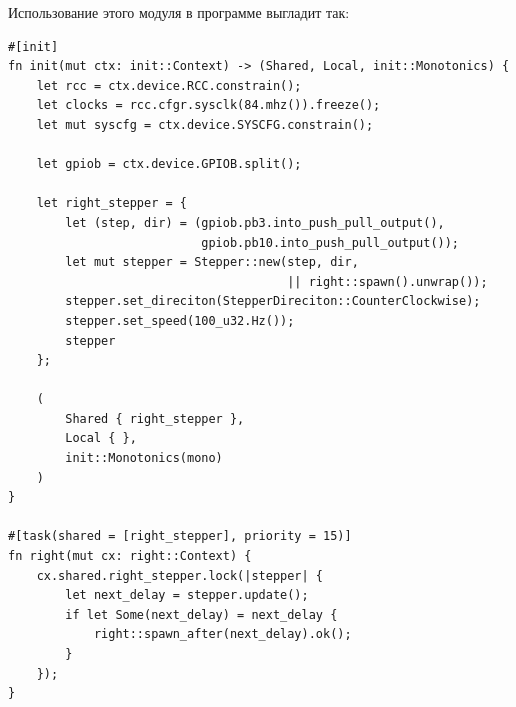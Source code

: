\documentclass[11pt]{article}
\begin{document}
Использование этого модуля в программе выгладит так:
\begin{verbatim}
#[init]
fn init(mut ctx: init::Context) -> (Shared, Local, init::Monotonics) {
    let rcc = ctx.device.RCC.constrain();
    let clocks = rcc.cfgr.sysclk(84.mhz()).freeze();
    let mut syscfg = ctx.device.SYSCFG.constrain();

    let gpiob = ctx.device.GPIOB.split();

    let right_stepper = {
        let (step, dir) = (gpiob.pb3.into_push_pull_output(),
                           gpiob.pb10.into_push_pull_output());
        let mut stepper = Stepper::new(step, dir,
                                       || right::spawn().unwrap());
        stepper.set_direciton(StepperDireciton::CounterClockwise);
        stepper.set_speed(100_u32.Hz());
        stepper
    };

    (
        Shared { right_stepper },
        Local { },
        init::Monotonics(mono)
    )
}

#[task(shared = [right_stepper], priority = 15)]
fn right(mut cx: right::Context) {
    cx.shared.right_stepper.lock(|stepper| {
        let next_delay = stepper.update();
        if let Some(next_delay) = next_delay {
            right::spawn_after(next_delay).ok();
        }
    });
}
\end{verbatim}
\end{document}
